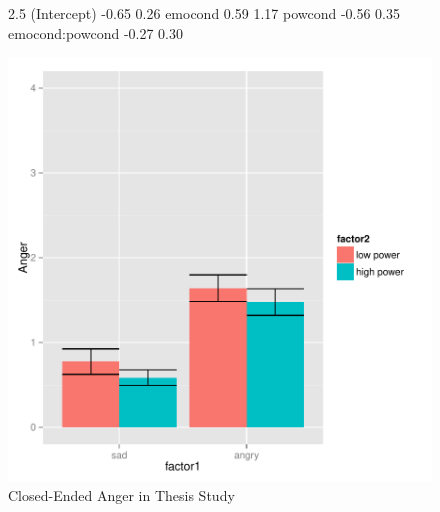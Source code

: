 \documentclass[man,apacite,floatsintext]{apa6}
\begin{document}
\begin{figure}
\begin{Schunk}
\begin{Soutput}
                2.5 %
(Intercept)     -0.65   0.26
emocond          0.59   1.17
powcond         -0.56   0.35
emocond:powcond -0.27   0.30
\end{Soutput}
\end{Schunk}
\includegraphics{PowerResults-ThesisCloseAngry}
\caption{Closed-Ended Anger in Thesis Study}
\end{figure}
\newpage
\end{document}
